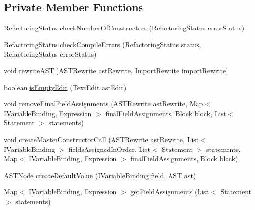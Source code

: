 \subsection*{Private Member Functions}
\begin{DoxyCompactItemize}
\item 
RefactoringStatus \hyperlink{classedu_1_1illinois_1_1canistelCassabanana_1_1RemoveDuplicateCodeInConstructorsRefactoring_a4462be965c484c7b5cde7305c6e8e08b}{checkNumberOfConstructors} (RefactoringStatus errorStatus)
\item 
RefactoringStatus \hyperlink{classedu_1_1illinois_1_1canistelCassabanana_1_1RemoveDuplicateCodeInConstructorsRefactoring_a63c9b559e564a9d3d3699316fd9e774a}{checkCompileErrors} (RefactoringStatus status, RefactoringStatus errorStatus)
\item 
void \hyperlink{classedu_1_1illinois_1_1canistelCassabanana_1_1RemoveDuplicateCodeInConstructorsRefactoring_a602006eb1454fdcbbe6e84f29ca01130}{rewriteAST} (ASTRewrite astRewrite, ImportRewrite importRewrite)
\item 
boolean \hyperlink{classedu_1_1illinois_1_1canistelCassabanana_1_1RemoveDuplicateCodeInConstructorsRefactoring_a2f13ae3bf9c9cd61095bf4b857f07b3d}{isEmptyEdit} (TextEdit astEdit)
\item 
void \hyperlink{classedu_1_1illinois_1_1canistelCassabanana_1_1RemoveDuplicateCodeInConstructorsRefactoring_a3fc8aaa7e5ed3f45299931fe12e5f456}{removeFinalFieldAssignments} (ASTRewrite astRewrite, Map$<$ IVariableBinding, Expression $>$ finalFieldAssignments, Block block, List$<$ Statement $>$ statements)
\item 
void \hyperlink{classedu_1_1illinois_1_1canistelCassabanana_1_1RemoveDuplicateCodeInConstructorsRefactoring_a52017e4e3161be3134592dbd8e3c3601}{createMasterConstructorCall} (ASTRewrite astRewrite, List$<$ IVariableBinding $>$ fieldsAssignedInOrder, List$<$ Statement $>$ statements, Map$<$ IVariableBinding, Expression $>$ finalFieldAssignments, Block block)
\item 
ASTNode \hyperlink{classedu_1_1illinois_1_1canistelCassabanana_1_1RemoveDuplicateCodeInConstructorsRefactoring_acffbec730ed1bbe7ed92f70115c8d1dd}{createDefaultValue} (IVariableBinding field, AST \hyperlink{classedu_1_1illinois_1_1canistelCassabanana_1_1RemoveDuplicateCodeInConstructorsRefactoring_ab3b3926a515821596ed383f908c322c1}{ast})
\item 
Map$<$ IVariableBinding, Expression $>$ \hyperlink{classedu_1_1illinois_1_1canistelCassabanana_1_1RemoveDuplicateCodeInConstructorsRefactoring_a4af7b99035dc86798fe1135fd561d2dd}{getFieldAssignments} (List$<$ Statement $>$ statements)

\end{DoxyCompactItemize}

